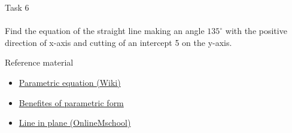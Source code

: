 \documentclass[aspectratio=169]{beamer}
\newcommand{\fbckg}[1]{\usebackgroundtemplate{\texttt{[image: \#1]}}}%
\begin{document}
\begin{frame}[t]{Task 6}
    \framesubtitle{}
    Find the equation of the straight line making an angle $135^{\circ}$ with the positive direction of x-axis and cutting of an intercept 5 on the y-axis.
    
\end{frame}

\begin{frame}[t]{Reference material}
    \Large
    \begin{itemize}
        \item \href{https://en.wikipedia.org/wiki/Parametric_equation}{Parametric equation (Wiki)}
        \item \href{https://www.youtube.com/watch?v=3gbxDyivUx0}{Benefites of parametric form}
        \item \href{https://onlinemschool.com/math/library/analytic_geometry/line/}{Line in plane (OnlineMschool)}
    \end{itemize}
\end{frame}

\fbckg{fibeamer/figs/last_page.png}
\frame[plain]{}
\end{document}

